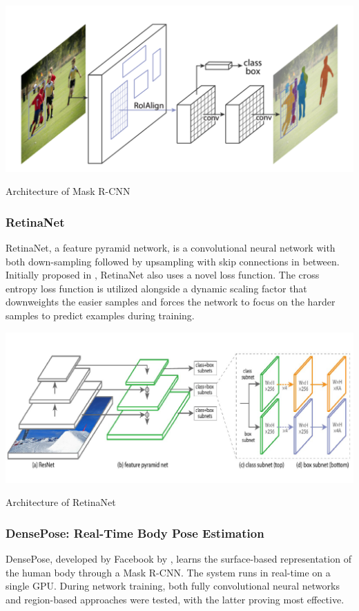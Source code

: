 \begin{table}[!ht]
  \includegraphics[width=\textwidth]{figs/maskrcnn.png}
  \caption{Architecture of Mask R-CNN}
  \label{fig:maskrcnn}
\end{table}


\subsubsection{RetinaNet}
RetinaNet, a feature pyramid network, is a convolutional neural network with both down-sampling followed by upsampling with skip connections in between.
Initially proposed in \cite{DBLP:journals/corr/abs-1708-02002}, RetinaNet also uses a novel loss function.
The cross entropy loss function is utilized alongside a dynamic scaling factor that downweights the easier samples and forces the network to focus on the harder samples to predict examples during training.

\begin{table}[!ht]
  \includegraphics[width=\textwidth]{figs/retina_net.png}
  \caption{Architecture of RetinaNet}
  \label{fig:retina_net}
\end{table}


\subsubsection{DensePose: Real-Time Body Pose Estimation}
DensePose, developed by Facebook by \cite{DBLP:journals/corr/abs-1809-01995}, learns the surface-based representation of the human body through a Mask R-CNN.
The system runs in real-time on a single GPU.
During network training, both fully convolutional neural networks and region-based approaches were tested, with the latter proving most effective. 

